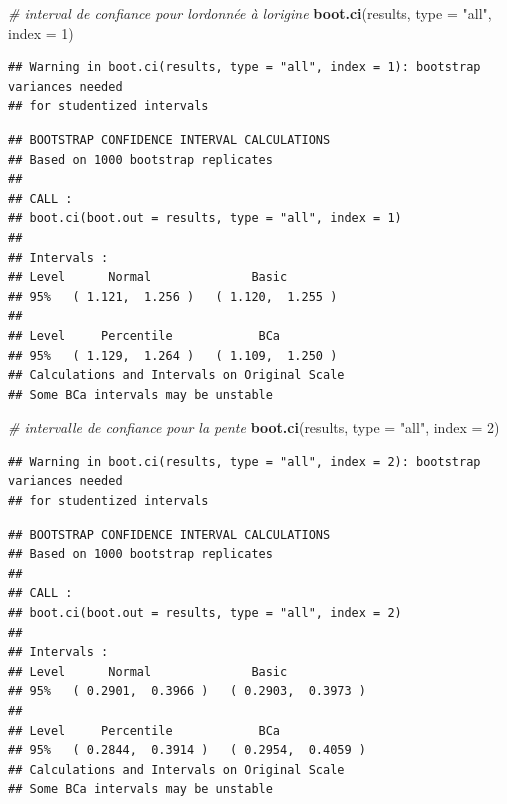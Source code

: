 \documentclass[
  12pt,
]{book}
\newenvironment{Shaded}{\begin{snugshade}}{\end{snugshade}}
\newcommand{\CommentTok}[1]{\textcolor[rgb]{0.56,0.35,0.01}{\textit{#1}}}
\newcommand{\DataTypeTok}[1]{\textcolor[rgb]{0.13,0.29,0.53}{#1}}
\newcommand{\DecValTok}[1]{\textcolor[rgb]{0.00,0.00,0.81}{#1}}
\newcommand{\KeywordTok}[1]{\textcolor[rgb]{0.13,0.29,0.53}{\textbf{#1}}}
\newcommand{\NormalTok}[1]{#1}
\newcommand{\StringTok}[1]{\textcolor[rgb]{0.31,0.60,0.02}{#1}}
\begin{document}
\begin{Shaded}
\begin{Highlighting}[]
\CommentTok{\# interval de confiance pour l\textquotesingle{}ordonnée à l\textquotesingle{}origine}
\KeywordTok{boot.ci}\NormalTok{(results, }\DataTypeTok{type =} \StringTok{"all"}\NormalTok{, }\DataTypeTok{index =} \DecValTok{1}\NormalTok{)}
\end{Highlighting}
\end{Shaded}

\begin{verbatim}
## Warning in boot.ci(results, type = "all", index = 1): bootstrap variances needed
## for studentized intervals
\end{verbatim}

\begin{verbatim}
## BOOTSTRAP CONFIDENCE INTERVAL CALCULATIONS
## Based on 1000 bootstrap replicates
## 
## CALL : 
## boot.ci(boot.out = results, type = "all", index = 1)
## 
## Intervals : 
## Level      Normal              Basic         
## 95%   ( 1.121,  1.256 )   ( 1.120,  1.255 )  
## 
## Level     Percentile            BCa          
## 95%   ( 1.129,  1.264 )   ( 1.109,  1.250 )  
## Calculations and Intervals on Original Scale
## Some BCa intervals may be unstable
\end{verbatim}

\begin{Shaded}
\begin{Highlighting}[]
\CommentTok{\# intervalle de confiance pour la pente}
\KeywordTok{boot.ci}\NormalTok{(results, }\DataTypeTok{type =} \StringTok{"all"}\NormalTok{, }\DataTypeTok{index =} \DecValTok{2}\NormalTok{)}
\end{Highlighting}
\end{Shaded}

\begin{verbatim}
## Warning in boot.ci(results, type = "all", index = 2): bootstrap variances needed
## for studentized intervals
\end{verbatim}

\begin{verbatim}
## BOOTSTRAP CONFIDENCE INTERVAL CALCULATIONS
## Based on 1000 bootstrap replicates
## 
## CALL : 
## boot.ci(boot.out = results, type = "all", index = 2)
## 
## Intervals : 
## Level      Normal              Basic         
## 95%   ( 0.2901,  0.3966 )   ( 0.2903,  0.3973 )  
## 
## Level     Percentile            BCa          
## 95%   ( 0.2844,  0.3914 )   ( 0.2954,  0.4059 )  
## Calculations and Intervals on Original Scale
## Some BCa intervals may be unstable
\end{verbatim}
\end{document}

